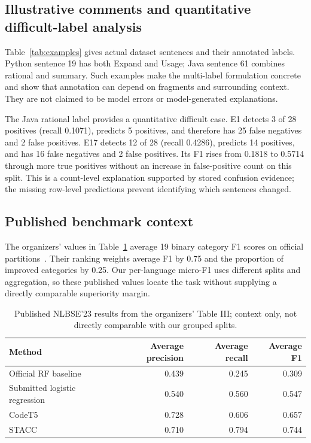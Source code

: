 \subsection{Illustrative comments and quantitative difficult-label analysis}\label{sec:illustrations}
Table~\ref{tab:examples} gives actual dataset sentences and their annotated labels. Python sentence 19 has both Expand and Usage; Java sentence 61 combines rational and summary. Such examples make the multi-label formulation concrete and show that annotation can depend on fragments and surrounding context. They are not claimed to be model errors or model-generated explanations.


The Java rational label provides a quantitative difficult case. E1 detects 3 of 28 positives (recall 0.1071), predicts 5 positives, and therefore has 25 false negatives and 2 false positives. E17 detects 12 of 28 (recall 0.4286), predicts 14 positives, and has 16 false negatives and 2 false positives. Its F1 rises from 0.1818 to 0.5714 through more true positives without an increase in false-positive count on this split. This is a count-level explanation supported by stored confusion evidence; the missing row-level predictions prevent identifying which sentences changed.

\subsection{Published benchmark context}\label{sec:published}
The organizers' values in Table~\ref{tab:official} average 19 binary category F1 scores on official partitions~\cite{nlbse_overview}. Their ranking weights average F1 by 0.75 and the proportion of improved categories by 0.25. Our per-language micro-F1 uses different splits and aggregation, so these published values locate the task without supplying a directly comparable superiority margin.
\begin{table}[htbp]\centering\small
\caption{Published NLBSE'23 results from the organizers' Table III; context only, not directly comparable with our grouped splits.}\label{tab:official}
\begin{tabular}{lrrr}\toprule Method & Average precision & Average recall & Average F1\\\midrule
Official RF baseline & 0.439 & 0.245 & 0.309\\
Submitted logistic regression & 0.540 & 0.560 & 0.547\\
CodeT5 & 0.728 & 0.606 & 0.657\\
STACC & 0.710 & 0.794 & 0.744\\\bottomrule
\end{tabular}\end{table}
